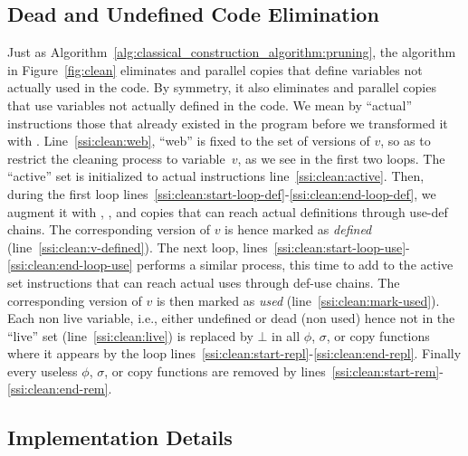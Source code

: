 {\subsection{Dead and Undefined Code Elimination}
Just as Algorithm~\ref{alg:classical_construction_algorithm:pruning}, the algorithm in Figure~\ref{fig:clean} eliminates \phifuns and parallel copies that define variables not actually used in the code. By symmetry, it also eliminates \sigmafuns  and parallel copies  that use variables not actually defined in the code.
We mean by ``actual'' instructions those that already existed in the program before we transformed it with \ssiSplit.
Line~\ref{ssi:clean:web}, ``web'' is fixed to the set of versions of $v$, so as to restrict the cleaning process to variable~$v$, as we see in the first two loops.
The ``active'' set is initialized to actual instructions line~\ref{ssi:clean:active}.
Then, during the first loop lines~\ref{ssi:clean:start-loop-def}-\ref{ssi:clean:end-loop-def}, we augment it with \phifuns, \sigmafuns, and copies that can reach actual definitions through use-def chains.
The corresponding version of $v$ is hence marked as \emph{defined} (line~\ref{ssi:clean:v-defined}).
The next loop, lines~\ref{ssi:clean:start-loop-use}-\ref{ssi:clean:end-loop-use} performs a similar process, this time to add to the active set instructions that can reach actual uses through def-use chains.
The corresponding version of $v$ is then marked as \emph{used} (line~\ref{ssi:clean:mark-used}).
Each non live variable, i.e., either undefined or dead (non used) hence not in the ``live'' set (line~\ref{ssi:clean:live}) is replaced by $\bot$ in all $\phi$, $\sigma$, or copy functions where it appears by the loop lines~\ref{ssi:clean:start-repl}-\ref{ssi:clean:end-repl}.
Finally every useless $\phi$, $\sigma$, or copy functions are removed by lines~\ref{ssi:clean:start-rem}-\ref{ssi:clean:end-rem}.
\subsection{Implementation Details}
\label{sub:special}

}
